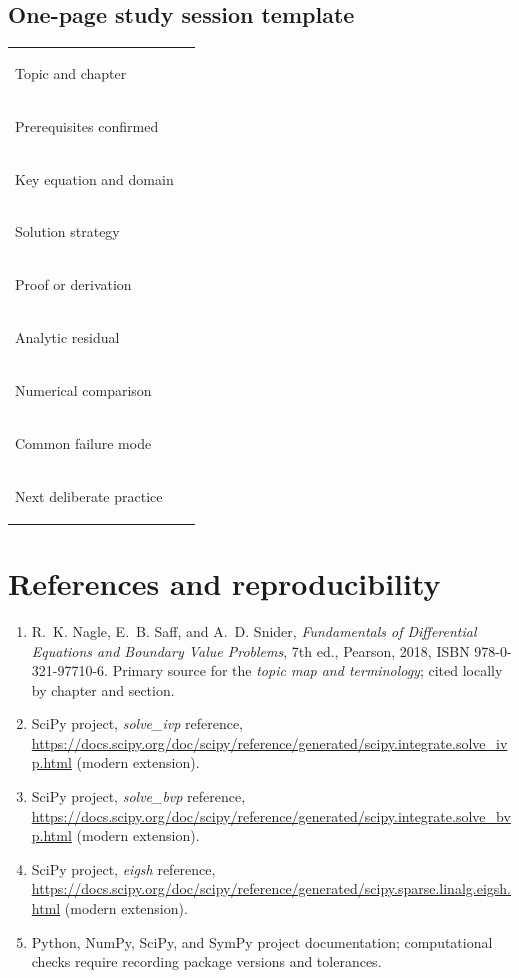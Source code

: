 \documentclass[11pt,letterpaper,oneside]{report}
\theoremstyle{definition}\newtheorem{definition}[theorem]{Definition}
\theoremstyle{remark}\newtheorem{remark}[theorem]{Remark}
\begin{document}
\section{One-page study session template}
\begin{tabularx}{\textwidth}{>{\bfseries\raggedright\arraybackslash}p{}X}\toprule
Topic and chapter & \rule{0pt}{18pt}\\[8pt]
Prerequisites confirmed & \\[10pt]
Key equation and domain & \\[14pt]
Solution strategy & \\[14pt]
Proof or derivation & \\[14pt]
Analytic residual & \\[14pt]
Numerical comparison & \\[14pt]
Common failure mode & \\[14pt]
Next deliberate practice & \\[14pt]
\bottomrule\end{tabularx}

\appendix
\chapter{References and reproducibility}
\begin{enumerate}
\item R.~K. Nagle, E.~B. Saff, and A.~D. Snider, \emph{Fundamentals of Differential Equations and Boundary Value Problems}, 7th ed., Pearson, 2018, ISBN 978-0-321-97710-6. Primary source for the \emph{topic map and terminology}; cited locally by chapter and section.
\item SciPy project, \emph{solve\_ivp} reference, \url{https://docs.scipy.org/doc/scipy/reference/generated/scipy.integrate.solve_ivp.html} (modern extension).
\item SciPy project, \emph{solve\_bvp} reference, \url{https://docs.scipy.org/doc/scipy/reference/generated/scipy.integrate.solve_bvp.html} (modern extension).
\item SciPy project, \emph{eigsh} reference, \url{https://docs.scipy.org/doc/scipy/reference/generated/scipy.sparse.linalg.eigsh.html} (modern extension).
\item Python, NumPy, SciPy, and SymPy project documentation; computational checks require recording package versions and tolerances.
\end{enumerate}
\end{document}
